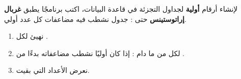\begin{statement}
لإنشاء أرقام \textbf{أولية} لجداول التجزئة في قاعدة البيانات، اكتب برنامجًا يطبق \textbf{غربال إراتوستينس} حتى : جدول  نشطب فيه مضاعفات كل عدد أولي.
\end{statement}
\begin{stepsbox}\begin{enumerate}
\item نهيئ  لكل .
\item لكل  من  ما دام : إذا كان أوليًا نشطب مضاعفاته بدءًا من .
\item نعرض الأعداد التي بقيت.
\end{enumerate}\end{stepsbox}
